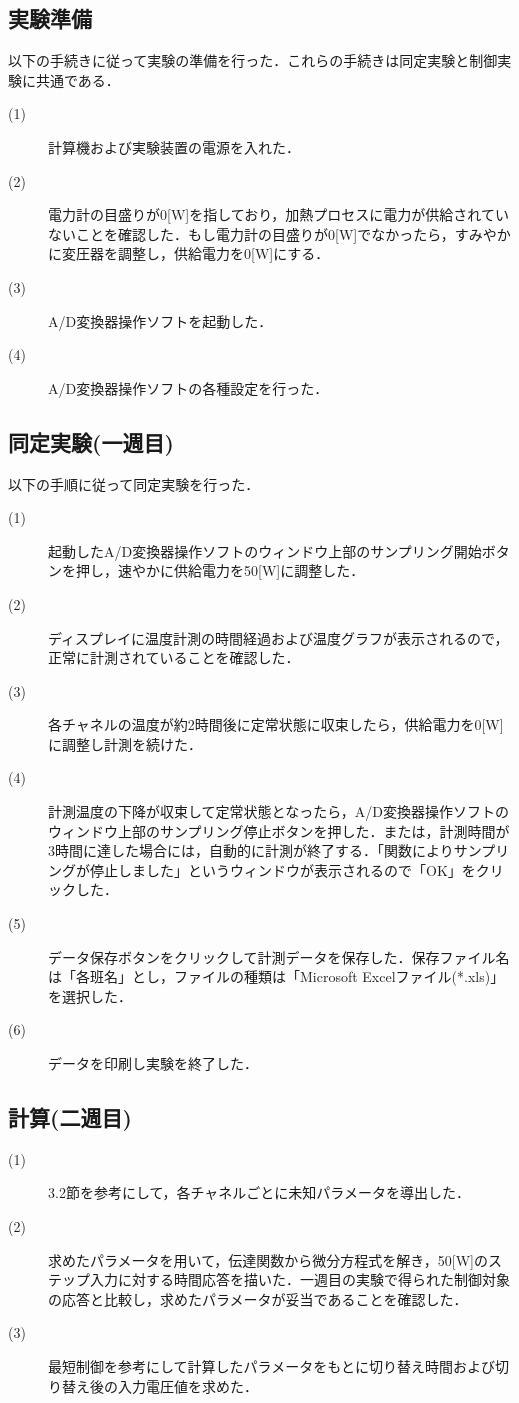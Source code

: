 \documentclass[12pt]{jsarticle}
\begin{document}
\subsection{実験準備}
以下の手続きに従って実験の準備を行った．これらの手続きは同定実験と制御実験に共通である．
\begin{description}
  \item[(1)]計算機および実験装置の電源を入れた．
  \item[(2)]電力計の目盛りが0[W]を指しており，加熱プロセスに電力が供給されていないことを確認した．もし電力計の目盛りが0[W]でなかったら，すみやかに変圧器を調整し，供給電力を0[W]にする．
  \item[(3)]A/D変換器操作ソフトを起動した．
  \item[(4)]A/D変換器操作ソフトの各種設定を行った．
\end{description}
\subsection{同定実験(一週目)}
以下の手順に従って同定実験を行った．
\begin{description}
  \item[(1)]起動したA/D変換器操作ソフトのウィンドウ上部のサンプリング開始ボタンを押し，速やかに供給電力を50[W]に調整した．
  \item[(2)]ディスプレイに温度計測の時間経過および温度グラフが表示されるので，正常に計測されていることを確認した．
  \item[(3)]各チャネルの温度が約2時間後に定常状態に収束したら，供給電力を0[W]に調整し計測を続けた．
  \item[(4)]計測温度の下降が収束して定常状態となったら，A/D変換器操作ソフトのウィンドウ上部のサンプリング停止ボタンを押した．または，計測時間が3時間に達した場合には，自動的に計測が終了する．「関数によりサンプリングが停止しました」というウィンドウが表示されるので「OK」をクリックした．
  \item[(5)]データ保存ボタンをクリックして計測データを保存した．保存ファイル名は「各班名」とし，ファイルの種類は「Microsoft Excelファイル(*.xls)」を選択した．
  \item[(6)]データを印刷し実験を終了した．
\end{description}
\subsection{計算(二週目)}
\begin{description}
  \item[(1)]3.2節を参考にして，各チャネルごとに未知パラメータを導出した．
  \item[(2)]求めたパラメータを用いて，伝達関数から微分方程式を解き，50[W]のステップ入力に対する時間応答を描いた．一週目の実験で得られた制御対象の応答と比較し，求めたパラメータが妥当であることを確認した．
  \item[(3)]最短制御を参考にして計算したパラメータをもとに切り替え時間および切り替え後の入力電圧値を求めた．
\end{description}
\end{document}
